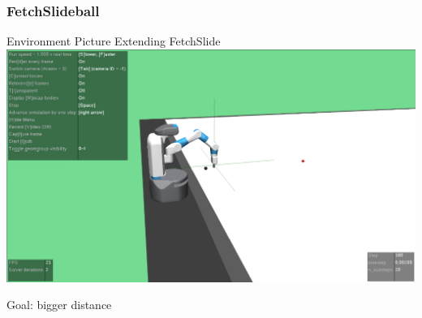 



\begin{frame}
	\frametitle{FetchSlideball}	
	\vspace{1cm}
	
	Environment Picture
	Extending FetchSlide
	\includegraphics[width=\textwidth, height=.55\textheight]{./Ressourcen/Figures/FetchSlideball-v3.pdf}
	
	
	Goal: bigger distance
	
\end{frame}
\clearpage







